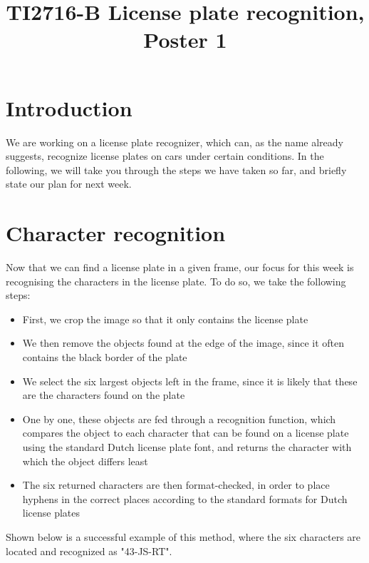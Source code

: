 \documentclass{tudelftposter}
\title{TI2716-B License plate recognition, Poster 1}
\begin{document}
\maketitle
\section{Introduction}
We are working on a license plate recognizer, which can, as the name already suggests, recognize license plates on cars under certain conditions. In the following, we will take you through the steps we have taken so far, and briefly state our plan for next week. 

\section{Character recognition}
Now that we can find a license plate in a given frame, our focus for this week is recognising the characters in the license plate. To do so, we take the following steps:
\begin{itemize}
\item First, we crop the image so that it only contains the license plate
\item We then remove the objects found at the edge of the image, since it often contains the black border of the plate
\item We select the six largest objects left in the frame, since it is likely that these are the characters found on the plate
\item One by one, these objects are fed through a recognition function, which compares the object to each character that can be found on a license plate using the standard Dutch license plate font, and returns the character with which the object differs least
\item The six returned characters are then format-checked, in order to place hyphens in the correct places according to the standard formats for Dutch license plates
\end{itemize}
Shown below is a successful example of this method, where the six characters are located and recognized as "43-JS-RT".
\end{document}

